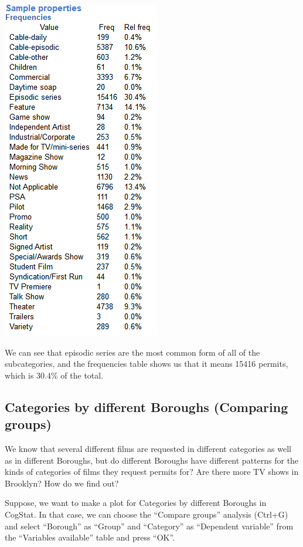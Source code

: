 \documentclass[
]{book}
\begin{document}
\includegraphics{img/ch1/Expvar_sampleprop(subcategory).png}

We can see that episodic series are the most common form of all of the subcategories, and the frequencies table shows us that it means 15416 permits, which is 30.4\% of the total.

\hypertarget{categories-by-different-boroughs-comparing-groups}{%
\subsection{Categories by different Boroughs (Comparing groups)}\label{categories-by-different-boroughs-comparing-groups}}

We know that several different films are requested in different categories as well as in different Boroughs, but do different Boroughs have different patterns for the kinds of categories of films they request permits for? Are there more TV shows in Brooklyn? How do we find out?

Suppose, we want to make a plot for Categories by different Boroughs in CogStat. In that case, we can choose the ``Compare groups'' analysis (Ctrl+G) and select ``Borough'' as ``Group'' and ``Category'' as ``Dependent variable'' from the ``Variables available'' table and press ``OK''.
\end{document}

